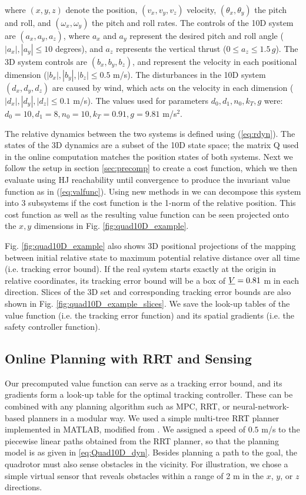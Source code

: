 where $(x, y, z)$ denote the position, $(v_x, v_y, v_z)$ velocity, $(\theta_x, \theta_y)$ the pitch and roll, and $(\omega_x, \omega_y)$ the pitch and roll rates. The controls of the 10D system are $(a_x, a_y, a_z)$, where $a_x$ and $a_y$ represent the desired pitch and roll angle ($|a_x|,|a_y|\leq10$ degrees), and $a_z$ represents the vertical thrust ($0\leq a_z\leq 1.5\,g$). The 3D system controls are $(b_x, b_y, b_z)$, and represent the velocity in each positional dimension ($|b_x|,|b_y|,|b_z|\leq0.5$ m/s). The disturbances in the 10D system $(d_x, d_y, d_z)$ are caused by wind, which acts on the velocity in each dimension ($|d_x|,|d_y|,|d_z|\leq0.1$ m/s). The values used for parameters $d_0,d_1,n_0,k_T,g$ were: $d_0=10,d_1=8,n_0=10,k_T=0.91,g=9.81$ m/s$^2$.

The relative dynamics between the two systems is defined using (\ref{eq:rdyn}). The states of the 3D dynamics are a subset of the 10D state space; the matrix Q used in the online computation matches the position states of both systems. Next we follow the setup in section \ref{sec:precomp} to create a cost function, which we then evaluate using HJ reachability until convergence to produce the invariant value function as in (\ref{eq:valfunc}). Using new methods in \cite{Chen2016DecouplingExact, Chen2016DecouplingJournal} we can decompose this system into 3 subsystems if the cost function is the 1-norm of the relative position. This cost function as well as the resulting value function can be seen projected onto the $x,y$ dimensions in Fig. \ref{fig:quad10D_example}.

Fig. \ref{fig:quad10D_example} also shows 3D positional projections of the mapping between initial relative state to maximum potential relative distance over all time (i.e. tracking error bound). If the real system starts exactly at the origin in relative coordinates, its tracking error bound will be a box of $\underline{V} = 0.81$ m in each direction. Slices of the 3D set and corresponding tracking error bounds are also shown in Fig. \ref{fig:quad10D_example_slices}. We save the look-up tables of the value function (i.e. the tracking error function) and its spatial gradients (i.e. the safety controller function).

\subsection{Online Planning with RRT and Sensing}
Our precomputed value function can serve as a tracking error bound, and its gradients form a look-up table for the optimal tracking controller. These can be combined with any planning algorithm such as MPC, RRT, or neural-network-based planners in a modular way. We used a simple multi-tree RRT planner implemented in MATLAB, modified from \cite{Gavin2013}. We assigned a speed of $0.5$ m/s to the piecewise linear paths obtained from the RRT planner, so that the planning model is as given in \eqref{eq:Quad10D_dyn}. Besides planning a path to the goal, the quadrotor must also sense obstacles in the vicinity. For illustration, we chose a simple virtual sensor that reveals obstacles within a range of 2 m in the $x$, $y$, or $z$ directions.

